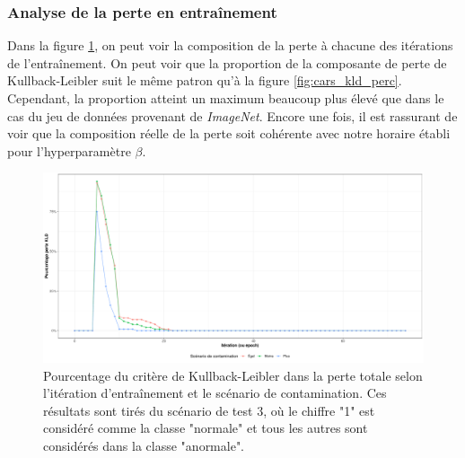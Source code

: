 \subsubsection{Analyse de la perte en entraînement}

Dans la figure \ref{fig:mnist_kld_perc}, on peut voir la composition de la perte à chacune des itérations de l'entraînement. On peut voir que la proportion de la composante de perte de Kullback-Leibler suit le même patron qu'à la figure \ref{fig:cars_kld_perc}. Cependant, la proportion atteint un maximum beaucoup plus élevé que dans le cas du jeu de données provenant de \textit{ImageNet}. Encore une fois, il est rassurant de voir que la composition réelle de la perte soit cohérente avec notre horaire établi pour l'hyperparamètre $\beta$. 

\begin{figure}[h]
	\centering
	\includegraphics[width=\linewidth]{images/kld_mnist_scenario_3.pdf}
	\caption{Pourcentage du critère de Kullback-Leibler dans la perte totale selon l'itération d'entraînement et le scénario de contamination. Ces résultats sont tirés du scénario de test 3, où le chiffre "1" est considéré comme la classe "normale" et tous les autres sont considérés dans la classe "anormale".}
	\label{fig:mnist_kld_perc}
\end{figure}

